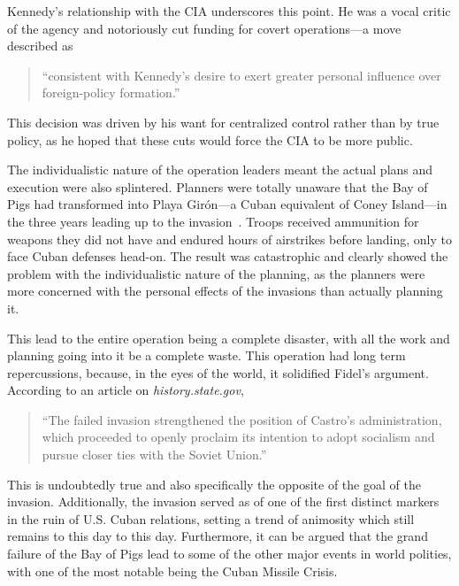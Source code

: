 \documentclass[12pt, draft]{article}
\begin{document}
    Kennedy's relationship with the CIA underscores this point. He was a vocal critic of the agency and notoriously cut funding for covert operations—a move described as 
    
    \begin{quotation}
        ``consistent with Kennedy's desire to exert greater personal influence over foreign-policy formation.''~\parencite{JeffreysJones2003}
    \end{quotation}

    This decision was driven by his want for centralized control rather than by true policy, as he hoped that these cuts would force the CIA to be more public.

    The individualistic nature of the operation leaders meant the actual plans and execution were also splintered. Planners were totally unaware that the Bay of Pigs had transformed into Playa Girón—a Cuban equivalent of Coney Island—in the three years leading up to the invasion~\parencite{Wyden1979}. Troops received ammunition for weapons they did not have and endured hours of airstrikes before landing, only to face Cuban defenses head-on. The result was catastrophic and clearly showed the problem with the individualistic nature of the planning, as the planners were more concerned with the personal effects of the invasions than actually planning it. 

    This lead to the entire operation being a complete disaster, with all the work and planning going into it be a complete waste. This operation had long term repercussions, because, in the eyes of the world, it solidified Fidel's argument. According to an article on \textit{history.state.gov}, 

    \begin{quotation}
        ``The failed invasion strengthened the position of Castro's administration, which proceeded to openly proclaim its intention to adopt socialism and pursue closer ties with the Soviet Union.'' \parencite{state_bayofpigs}
    \end{quotation}

    This is undoubtedly true and also specifically the opposite of the goal of the invasion. Additionally, the invasion served as of one of the first distinct markers in the ruin of U.S. Cuban relations, setting a trend of animosity which still remains to this day to this day. Furthermore, it can be argued that the grand failure of the Bay of Pigs lead to some of the other major events in world polities, with one of the most notable being the Cuban Missile Crisis. \parencite{cfr_uscuba} 
\end{document}
